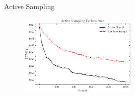 \begin{frame}{Active Sampling}

\begin{figure}[!htb]
\centering
\includegraphics[width=0.5\textwidth]{Images/Active_vs_random_norm.pdf}
\label{fig:active_sampling_vs_random}
\end{figure}
    
\end{frame}